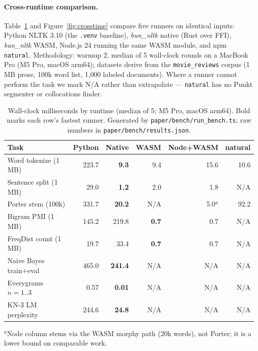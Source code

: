 \documentclass[smallextended]{svjour3}
\begin{document}
\paragraph{Cross-runtime comparison.}
Table~\ref{tab:crosstime} and Figure~\ref{fig:crosstime} compare five runners on identical inputs: Python NLTK 3.10 (the \texttt{.venv} baseline), \emph{bun\_nltk} native (Rust over FFI), \emph{bun\_nltk} WASM, Node.js 24 running the same WASM module, and npm \texttt{natural}. Methodology: warmup 2, median of 5 wall-clock rounds on a MacBook Pro (M5 Pro, macOS arm64); datasets derive from the \texttt{movie\_reviews} corpus (1\,MB prose, 100k word list, 1{,}000 labeled documents). Where a runner cannot perform the task we mark N/A rather than extrapolate --- \texttt{natural} has no Punkt segmenter or collocations finder.

\begin{table}[H]
\centering
\caption{Wall-clock milliseconds by runtime (median of 5; M5 Pro, macOS arm64). Bold marks each row's fastest runner. Generated by \texttt{paper/bench/run\_bench.ts}; raw numbers in \texttt{paper/bench/results.json}.}
\label{tab:crosstime}
\begin{tabular}{@{}l r r r r r@{}}
\toprule
Task & Python & Native & WASM & Node+WASM & natural \\
\midrule
Word tokenize (1\,MB)        & 223.7 & \textbf{9.3}   & 9.4   & 15.6  & 10.6 \\
Sentence split (1\,MB)       & 29.0  & \textbf{1.2}   & 2.0   & 1.8   & N/A \\
Porter stem (100k)           & 331.7 & \textbf{20.2}  & N/A   & 5.0$^{a}$ & 92.2 \\
Bigram PMI (1\,MB)           & 145.2 & 219.8          & \textbf{0.7}   & 0.7   & N/A \\
FreqDist count (1\,MB)       & 19.7  & 33.4           & \textbf{0.7}   & 0.7   & N/A \\
Naive Bayes train+eval       & 465.0 & \textbf{241.4} & N/A   & N/A   & N/A \\
Everygrams $n{=}1..3$        & 0.57  & \textbf{0.01}  & N/A   & N/A   & N/A \\
KN-3 LM perplexity           & 244.6 & \textbf{24.8}  & N/A   & N/A   & N/A \\
\bottomrule
\end{tabular}

{\footnotesize $^{a}$Node column stems via the WASM morphy path (20k words), not Porter; it is a lower bound on comparable work.}
\end{table}
\end{document}
